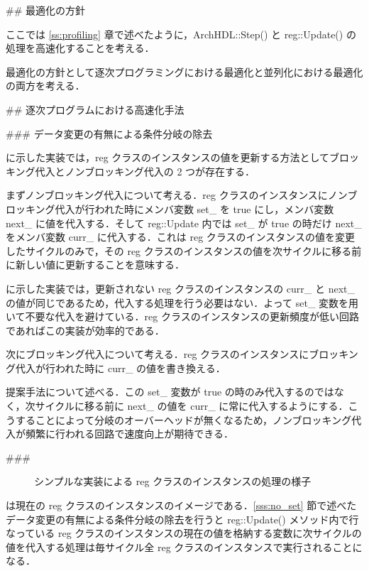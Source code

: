 ## 最適化の方針

ここでは \ref{ss:profiling} 章で述べたように，ArchHDL::Step() と reg::Update() の処理を高速化することを考える．

最適化の方針として逐次プログラミングにおける最適化と並列化における最適化の両方を考える．


## 逐次プログラムにおける高速化手法

### データ変更の有無による条件分岐の除去 \label{sss:no_set}

 に示した実装では，reg クラスのインスタンスの値を更新する方法としてブロッキング代入とノンブロッキング代入の 2 つが存在する．

まずノンブロッキング代入について考える．reg クラスのインスタンスにノンブロッキング代入が行われた時にメンバ変数 set_ を true にし，メンバ変数 next_ に値を代入する．そして reg::Update 内では set_ が true の時だけ next_ をメンバ変数 curr_ に代入する．これは reg クラスのインスタンスの値を変更したサイクルのみで，その reg クラスのインスタンスの値を次サイクルに移る前に新しい値に更新することを意味する．

 に示した実装では，更新されない reg クラスのインスタンスの curr_ と next_ の値が同じであるため，代入する処理を行う必要はない．よって set_ 変数を用いて不要な代入を避けている．reg クラスのインスタンスの更新頻度が低い回路であればこの実装が効率的である．

次にブロッキング代入について考える．reg クラスのインスタンスにブロッキング代入が行われた時に curr_ の値を書き換える．

提案手法について述べる．この set_ 変数が true の時のみ代入するのではなく，次サイクルに移る前に next_ の値を curr_ に常に代入するようにする．こうすることによって分岐のオーバーヘッドが無くなるため，ノンブロッキング代入が頻繁に行われる回路で速度向上が期待できる．


###  \label{sss:mem_copy}

\begin{figure}[t]
 \begin{center}
  
 \end{center}
 \caption{シンプルな実装による reg クラスのインスタンスの処理の様子}
 \label{fig:regs}
\end{figure}

 は現在の reg クラスのインスタンスのイメージである．\ref{sss:no_set} 節で述べたデータ変更の有無による条件分岐の除去を行うと reg::Update() メソッド内で行なっている reg クラスのインスタンスの現在の値を格納する変数に次サイクルの値を代入する処理は毎サイクル全 reg クラスのインスタンスで実行されることになる．

